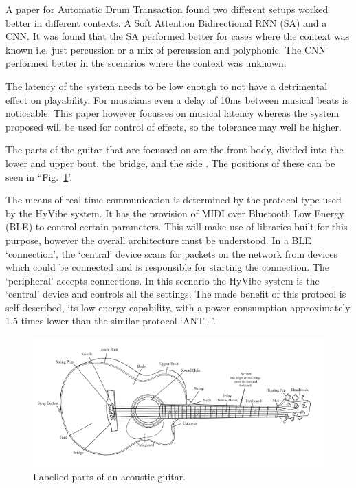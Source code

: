 \documentclass[conference]{IEEEtran}
\begin{document}
A paper for Automatic Drum Transaction found two different setups worked better in different contexts. A Soft Attention Bidirectional RNN (SA) and a CNN. It was found that the SA performed
better for cases where the context was known i.e. just percussion or a mix of percussion and polyphonic. The CNN performed better in the scenarios where the context was unknown.

The latency of the system needs to be low enough to not have a detrimental effect on playability. For musicians even a delay of 10ms between musical beats \cite{b4} is noticeable. This paper however
focusses on musical latency whereas the system proposed will be used for control of effects, so the tolerance may well be higher.

The parts of the guitar that are focussed on are the front body, divided into the lower and upper bout, the bridge, and the side \cite{b3}. The positions of these can be seen in ``Fig.~\ref{guitar}'.

The means of real-time communication is determined by the protocol type used by the HyVibe system. It has the provision of MIDI over Bluetooth Low Energy (BLE) to control certain parameters. This will
make use of libraries built for this purpose, however the overall architecture must be understood. In a BLE `connection', the `central' device scans for packets on the network from devices which could be connected and 
is responsible for starting the connection. The `peripheral' accepts connections. In this scenario the HyVibe system is the `central' device and controls all the settings. The made benefit of this protocol is self-described,
its low energy capability, with a power consumption approximately 1.5 times lower than the similar protocol `ANT+'.


\begin{figure}[htbp]
    \centerline{\includegraphics[scale=0.4]{guitar.png}}
    \caption{Labelled parts of an acoustic guitar. \cite{b3}}
    \label{guitar}
    \end{figure}
\end{document}
